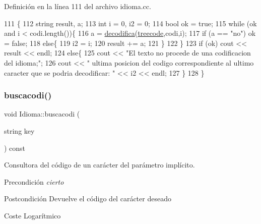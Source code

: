 Definición en la línea 111 del archivo idioma.\+cc.


\begin{DoxyCode}
111                                              \{
112   \textcolor{keywordtype}{string} result, a;
113   \textcolor{keywordtype}{int} i = 0, i2 = 0;
114   \textcolor{keywordtype}{bool} ok = \textcolor{keyword}{true};
115   \textcolor{keywordflow}{while} (ok and i < codi.length())\{
116     a = \hyperlink{class_idioma_a225fb55a6732d07e61bf310f5f29aa0e}{decodifica}(\hyperlink{class_idioma_a5eeaf73b2498503c5c686ac259e1f675}{treecode},codi,i);
117     \textcolor{keywordflow}{if} (a == \textcolor{stringliteral}{"no"}) ok = \textcolor{keyword}{false};
118     \textcolor{keywordflow}{else}\{
119       i2 = i;
120       result += a;
121     \}
122   \}
123   \textcolor{keywordflow}{if} (ok) cout << result << endl;
124   \textcolor{keywordflow}{else}\{
125     cout << \textcolor{stringliteral}{"El texto no procede de una codificacion del idioma;"};
126     cout << \textcolor{stringliteral}{" ultima posicion del codigo correspondiente al ultimo caracter que se podria decodificar: "} <<
       i2 << endl;
127   \}
128 \}
\end{DoxyCode}
\mbox{\label{class_idioma_a23589aa5ba65f484e2477ed611ce151f}} 
\subsubsection{\texorpdfstring{buscacodi()}{buscacodi()}}
{\footnotesize\ttfamily void Idioma\+::buscacodi (\begin{DoxyParamCaption}\item[{string}]{key }\end{DoxyParamCaption}) const}



Consultora del código de un carácter del parámetro implícito. 

\begin{DoxyPrecond}{Precondición}
{\itshape cierto} 
\end{DoxyPrecond}
\begin{DoxyPostcond}{Postcondición}
Devuelve el código del carácter deseado 
\end{DoxyPostcond}
\begin{DoxyParagraph}{Coste}
Logarítmico 
\end{DoxyParagraph}


